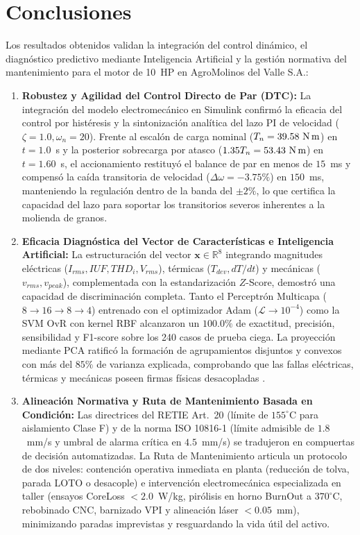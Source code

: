 \documentclass[conference]{IEEEtran}
\begin{document}
\section{Conclusiones}
Los resultados obtenidos validan la integración del control dinámico, el diagnóstico predictivo mediante Inteligencia Artificial y la gestión normativa del mantenimiento para el motor de 10~HP en AgroMolinos del Valle S.A.:

\begin{enumerate}
    \item \textbf{Robustez y Agilidad del Control Directo de Par (DTC):} La integración del modelo electromecánico en Simulink confirmó la eficacia del control por histéresis y la sintonización analítica del lazo PI de velocidad ($\zeta = 1.0, \omega_n = 20$). Frente al escalón de carga nominal ($T_n = 39.58~\text{N\,m}$) en $t = 1.0$~s y la posterior sobrecarga por atasco ($1.35 T_n = 53.43~\text{N\,m}$) en $t = 1.60$~s, el accionamiento restituyó el balance de par en menos de $15$~ms y compensó la caída transitoria de velocidad ($\Delta\omega = -3.75\%$) en $150$~ms, manteniendo la regulación dentro de la banda del $\pm 2\%$, lo que certifica la capacidad del lazo para soportar los transitorios severos inherentes a la molienda de granos.
    \item \textbf{Eficacia Diagnóstica del Vector de Características e Inteligencia Artificial:} La estructuración del vector $\mathbf{x} \in \mathbb{R}^8$ integrando magnitudes eléctricas ($I_{rms}, IUF, THD_i, V_{rms}$), térmicas ($T_{dev}, dT/dt$) y mecánicas ($v_{rms}, v_{peak}$), complementada con la estandarización $Z$-Score, demostró una capacidad de discriminación completa. Tanto el Perceptrón Multicapa ($8 \to 16 \to 8 \to 4$) entrenado con el optimizador Adam ($\mathcal{L} \to 10^{-4}$) como la SVM OvR con kernel RBF alcanzaron un $100.0\%$ de exactitud, precisión, sensibilidad y F1-score sobre los 240 casos de prueba ciega. La proyección mediante PCA ratificó la formación de agrupamientos disjuntos y convexos con más del $85\%$ de varianza explicada, comprobando que las fallas eléctricas, térmicas y mecánicas poseen firmas físicas desacopladas \cite{soualhi2022, gangsar2020}.
    \item \textbf{Alineación Normativa y Ruta de Mantenimiento Basada en Condición:} Las directrices del RETIE Art.~20 (límite de $155^\circ$C para aislamiento Clase F) y de la norma ISO 10816-1 (límite admisible de $1.8$~mm/s y umbral de alarma crítica en $4.5$~mm/s) se tradujeron en compuertas de decisión automatizadas. La Ruta de Mantenimiento articula un protocolo de dos niveles: contención operativa inmediata en planta (reducción de tolva, parada LOTO o desacople) e intervención electromecánica especializada en taller (ensayos CoreLoss $<2.0$~W/kg, pirólisis en horno BurnOut a $370^\circ$C, rebobinado CNC, barnizado VPI y alineación láser $<0.05$~mm), minimizando paradas imprevistas y resguardando la vida útil del activo.

\end{enumerate}
\end{document}
